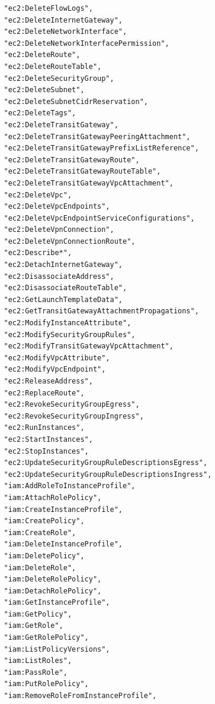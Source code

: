 \begin{verbatim}
                "ec2:DeleteFlowLogs",
                "ec2:DeleteInternetGateway",
                "ec2:DeleteNetworkInterface",
                "ec2:DeleteNetworkInterfacePermission",
                "ec2:DeleteRoute",
                "ec2:DeleteRouteTable",
                "ec2:DeleteSecurityGroup",
                "ec2:DeleteSubnet",
                "ec2:DeleteSubnetCidrReservation",
                "ec2:DeleteTags",
                "ec2:DeleteTransitGateway",
                "ec2:DeleteTransitGatewayPeeringAttachment",
                "ec2:DeleteTransitGatewayPrefixListReference",
                "ec2:DeleteTransitGatewayRoute",
                "ec2:DeleteTransitGatewayRouteTable",
                "ec2:DeleteTransitGatewayVpcAttachment",
                "ec2:DeleteVpc",
                "ec2:DeleteVpcEndpoints",
                "ec2:DeleteVpcEndpointServiceConfigurations",
                "ec2:DeleteVpnConnection",
                "ec2:DeleteVpnConnectionRoute",
                "ec2:Describe*",
                "ec2:DetachInternetGateway",
                "ec2:DisassociateAddress",
                "ec2:DisassociateRouteTable",
                "ec2:GetLaunchTemplateData",
                "ec2:GetTransitGatewayAttachmentPropagations",
                "ec2:ModifyInstanceAttribute",
                "ec2:ModifySecurityGroupRules",
                "ec2:ModifyTransitGatewayVpcAttachment",
                "ec2:ModifyVpcAttribute",
                "ec2:ModifyVpcEndpoint",
                "ec2:ReleaseAddress",
                "ec2:ReplaceRoute",
                "ec2:RevokeSecurityGroupEgress",
                "ec2:RevokeSecurityGroupIngress",
                "ec2:RunInstances",
                "ec2:StartInstances",
                "ec2:StopInstances",
                "ec2:UpdateSecurityGroupRuleDescriptionsEgress",
                "ec2:UpdateSecurityGroupRuleDescriptionsIngress",
                "iam:AddRoleToInstanceProfile",
                "iam:AttachRolePolicy",
                "iam:CreateInstanceProfile",
                "iam:CreatePolicy",
                "iam:CreateRole",
                "iam:DeleteInstanceProfile",
                "iam:DeletePolicy",
                "iam:DeleteRole",
                "iam:DeleteRolePolicy",
                "iam:DetachRolePolicy",
                "iam:GetInstanceProfile",
                "iam:GetPolicy",
                "iam:GetRole",
                "iam:GetRolePolicy",
                "iam:ListPolicyVersions",
                "iam:ListRoles",
                "iam:PassRole",
                "iam:PutRolePolicy",
                "iam:RemoveRoleFromInstanceProfile",

\end{verbatim}
